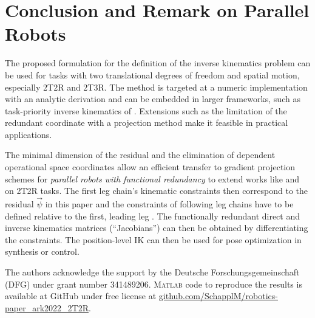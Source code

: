 \documentclass[graybox,vecphys]{svmult}
\newcommand{\ResR}[0]{\vec{\psi}}
\begin{document}
\vspace{-0.4cm}
\section{Conclusion and Remark on Parallel Robots}
\label{sec:conclusion}
\vspace{-0.2cm}

The proposed formulation for the definition of the inverse kinematics problem can be used for tasks with two translational degrees of freedom and spatial motion, especially 2T2R and 2T3R.
The method is targeted at a numeric implementation with an analytic derivation and can be embedded in larger frameworks, such as task-priority inverse kinematics of \cite{MoeAntTeePet2016}.
Extensions such as the limitation of the redundant coordinate with a projection method make it feasible in practical applications.

The minimal dimension of the residual and the elimination of dependent operational space coordinates allow an efficient transfer to gradient projection schemes for \emph{parallel robots with functional redundancy} to extend works like \cite{ChenMcIYi2003} and \cite{KoblerKotLexMaj2014} on 2T2R tasks.
The first leg chain's kinematic constraints then correspond to the residual $\ResR$ in this paper and the constraints of following leg chains have to be defined relative to the first, leading leg \cite{SchapplerTapOrt2019}.
The functionally redundant direct and inverse kinematics matrices (``Jacobians'') can then be obtained by differentiating the constraints. %
The position-level IK can then be used for pose optimization in synthesis or control.


\begin{acknowledgement} %
The authors acknowledge the support by the Deutsche Forschungsgemeinschaft (DFG) under grant number 341489206. \textsc{Matlab} code to reproduce the results
is available at GitHub under free license at \url{github.com/SchapplM/robotics-paper_ark2022_2T2R}.
\end{acknowledgement}
\vspace{-0.9cm} %
\renewcommand{\baselinestretch}{0.965} %


\end{document}
